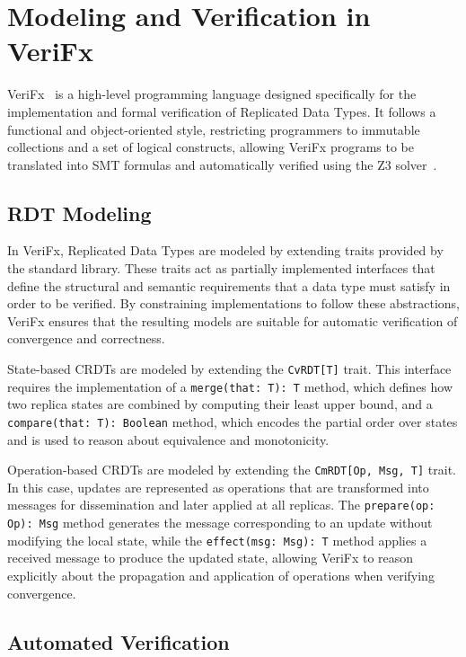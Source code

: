 \section{Modeling and Verification in VeriFx}
\label{sec:verifx}

VeriFx~\cite{porre2023masses} is a high-level programming language designed specifically for the implementation and formal verification of Replicated Data Types. It follows a functional and object-oriented style, restricting programmers to immutable collections and a set of logical constructs, allowing VeriFx programs to be translated into SMT formulas and automatically verified using the Z3 solver~\cite{z3}.

\subsection{RDT Modeling}
\label{sub:modeling}

In VeriFx, Replicated Data Types are modeled by extending traits provided by the standard library. These traits act as partially implemented interfaces that define the structural and semantic requirements that a data type must satisfy in order to be verified. By constraining implementations to follow these abstractions, VeriFx ensures that the resulting models are suitable for automatic verification of convergence and correctness.

State-based CRDTs are modeled by extending the \texttt{CvRDT[T]} trait. This interface requires the implementation of a \texttt{merge(that: T): T} method, which defines how two replica states are combined by computing their least upper bound, and a \texttt{compare(that: T): Boolean} method, which encodes the partial order over states and is used to reason about equivalence and monotonicity.

Operation-based CRDTs are modeled by extending the \texttt{CmRDT[Op, Msg, T]} trait. In this case, updates are represented as operations that are transformed into messages for dissemination and later applied at all replicas. The \texttt{prepare(op: Op): Msg} method generates the message corresponding to an update without modifying the local state, while the \texttt{effect(msg: Msg): T} method applies a received message to produce the updated state, allowing VeriFx to reason explicitly about the propagation and application of operations when verifying convergence.

\subsection{Automated Verification}
\label{sub:automated_verification}

